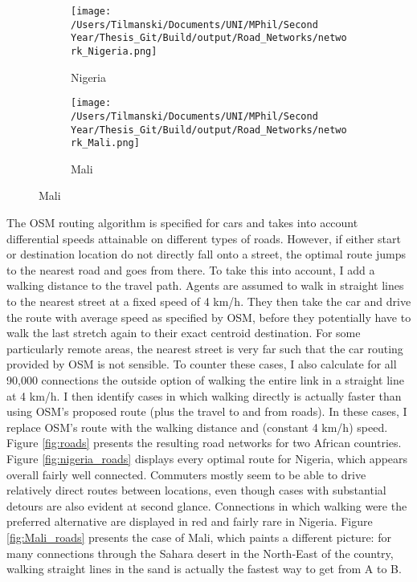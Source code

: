 \documentclass[11pt, oneside]{article}   	%
\begin{document}
\begin{figure}[t]
\centering
\caption{Road Networks for different countries as scraped off OSM}

\begin{subfigure}[c]{0.48\textwidth}
\texttt{[image: /Users/Tilmanski/Documents/UNI/MPhil/Second Year/Thesis\_Git/Build/output/Road\_Networks/network\_Nigeria.png]}
\caption{Nigeria}
\label{fig:nigeria_roads}
\end{subfigure}
\begin{subfigure}[c]{0.48\textwidth}
\texttt{[image: /Users/Tilmanski/Documents/UNI/MPhil/Second Year/Thesis\_Git/Build/output/Road\_Networks/network\_Mali.png]}
\caption{Mali}
\label{fig:Mali_roads}
\end{subfigure}
\label{fig:roads}
\end{figure}

The OSM routing algorithm is specified for cars and takes into account differential speeds attainable on different types of roads. However, if either start or destination location do not directly fall onto a street, the optimal route jumps to the nearest road and goes from there. To take this into account, I add a walking distance to the travel path. Agents are assumed to walk in straight lines to the nearest street at a fixed speed of 4 km/h. They then take the car and drive the route with average speed as specified by OSM, before they potentially have to walk the last stretch again to their exact centroid destination. For some particularly remote areas, the nearest street is very far such that the car routing provided by OSM is not sensible. To counter these cases, I also calculate for all 90,000 connections the outside option of walking the entire link in a straight line at 4 km/h. I then identify cases in which walking directly is actually faster than using OSM's proposed route (plus the travel to and from roads). In these cases, I replace OSM's route with the walking distance and (constant 4 km/h) speed. Figure \eqref{fig:roads} presents the resulting road networks for two African countries. Figure \eqref{fig:nigeria_roads} displays every optimal route for Nigeria, which appears overall fairly well connected. Commuters mostly seem to be able to drive relatively direct routes between locations, even though cases with substantial detours are also evident at second glance. Connections in which walking were the preferred alternative are displayed in red and fairly rare in Nigeria. Figure \eqref{fig:Mali_roads} presents the case of Mali, which paints a different picture: for many connections through the Sahara desert in the North-East of the country, walking straight lines in the sand is actually the fastest way to get from A to B.
\end{document}
